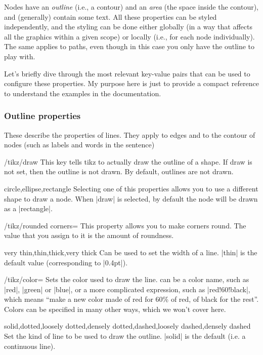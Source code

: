 \documentclass[a4paper]{ltxdoc}
\begin{document}
Nodes have an \emph{outline} (i.e., a contour) and an \emph{area} (the space inside the contour), and (generally) contain some text. All these properties can be styled independently, and the styling can be done either globally (in a way that affects all the graphics within a given scope) or locally (i.e., for each node individually). The same applies to paths, even though in this case you only have the outline to play with.

Let's briefly dive through the most relevant key-value pairs that can be used to configure these properties. My purpose here is just to provide a compact reference to understand the examples in the documentation.

\subsubsection{Outline properties}
These describe the properties of lines. They apply to edges and to the contour of nodes (such as labels and words in the sentence)
\begin{key}{/tikz/draw}
   This key tells tikz to actually draw the outline of a shape. If draw is not set, then the outline is not drawn. By default, outlines are not drawn.
\end{key}
\begin{keylist}[/tikz]{circle,ellipse,rectangle}
   Selecting one of this properties allows you to use a different shape to draw a node. When |draw| is selected, by default the node will be drawn as a |rectangle|.
\end{keylist}
\begin{key}{/tikz/rounded corners=}
   This property allows you to make corners round. The value that you assign to it is the amount of roundness.
\end{key}
\begin{keylist}[/tikz]{very thin,thin,thick,very thick}
   Can be used to set the width of a line. |thin| is the default value (corresponding to |0.4pt|).
\end{keylist}
\begin{key}{/tikz/color=}
   Sets the color used to draw the line.  can be a color name, such as |red|, |green| or |blue|, or a more complicated expression, such as |red!60!black|, which means ``make a new color made of red for 60\% of red, of black for the rest''. Colors can be specified in many other ways, which we won't cover here.
\end{key}
\begin{keylist}[/tikz]{solid,dotted,loosely dotted,densely dotted,dashed,loosely dashed,densely dashed}
Set the kind of line to be used to draw the outline. |solid| is the default (i.e. a continuous line).
\end{keylist}
\end{document}
